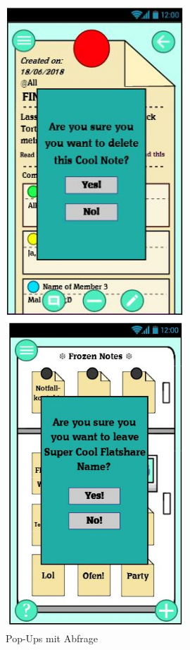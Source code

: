 \documentclass[a4paper]{scrreprt}
\begin{document}
    	\clearpage
    	
    	\begin{figure}[h!]
    		\begin{minipage}[t]{0.45\linewidth}
    			\flushright
    			\centering
    			\vspace{9mm}
    			\includegraphics[width=0.6\textwidth]{fridget_delete.JPG}
    			\caption{Pop-Ups mit Abfrage}
    			\label{fig:figure1}
    		\end{minipage}
    		\hspace{0.5cm}
    		\begin{minipage}[t]{0.45\linewidth}
    			\flushright
    			\centering
    			\vspace{9mm}
    			\includegraphics[width=0.6\textwidth]{fridget_leave.JPG}

\end{minipage}
\end{figure}
\end{document}
